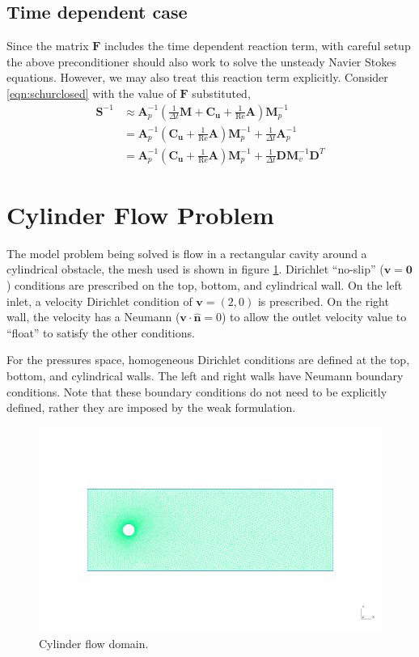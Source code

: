 \documentclass{article}
\newcommand{\mat}[1]{\bm{{#1}}}
\renewcommand{\vec}[1]{\bm{{#1}}}
\renewcommand{\Re}{\text{Re}}
\begin{document}
\subsection{Time dependent case}
Since the matrix $\mat{F}$ includes the time dependent reaction term, with careful setup the above preconditioner should also work to solve the unsteady Navier Stokes equations.  However, we may also treat this reaction term explicitly.  Consider \eqref{eqn:schurclosed} with the value of $\mat{F}$ substituted,
\begin{align}
  \mat{S}^{-1} &\approx \mat{A}_p^{-1} \left(\frac{1}{\Delta t}\mat{M} + \mat{C}_{\vec{u}} + \frac{1}{\Re} \mat{A}\right)  \mat{M}_p^{-1} \\
               &= \mat{A}_p^{-1} \left(\mat{C}_{\vec{u}} + \frac{1}{\Re} \mat{A}\right)  \mat{M}_p^{-1} + \frac{1}{\Delta t}\mat{A}_p^{-1} \\
               &= \mat{A}_p^{-1} \left(\mat{C}_{\vec{u}} + \frac{1}{\Re} \mat{A}\right)  \mat{M}_p^{-1} + \frac{1}{\Delta t}\mat{DM}_v^{-1}\mat{D}^T \label{eqn:pcdrfinal}
\end{align}
\section{Cylinder Flow Problem}
The model problem being solved is flow in a rectangular cavity around a cylindrical obstacle, the mesh used is shown in figure \ref{fig:domain}.  Dirichlet ``no-slip'' ($\vec{v}=\vec{0}$) conditions are prescribed on the top, bottom, and cylindrical wall.  On the left inlet, a velocity Dirichlet condition of $\vec{v}=\left(2,0\right)$ is prescribed.  On the right wall, the velocity has a Neumann ($\vec{v} \cdot \vec{\hat{n}} = 0$) to allow the outlet velocity value to ``float'' to satisfy the other conditions.

For the pressures space, homogeneous Dirichlet conditions are defined at the top, bottom, and cylindrical walls.  The left and right walls have Neumann boundary conditions.  Note that these boundary conditions do not need to be explicitly defined, rather they are imposed by the weak formulation.
\begin{figure}[h]
  \includegraphics[width=\textwidth]{figures/mesh_domain.pdf}
  \caption{Cylinder flow domain.}
  \label{fig:domain}
\end{figure}
\end{document}
